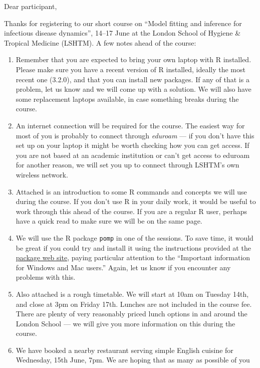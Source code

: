 \documentclass[paper=a4, 11pt]{scrlttr2}
\begin{document}
\begin{letter}{}
\opening{Dear participant,}
Thanks for registering to our short course on ``Model fitting and
inference for infectious disease dynamics'', 14--17 June at the London
School of Hygiene \& Tropical Medicine (LSHTM). A few notes ahead of
the course:

\begin{enumerate}
\item Remember that you are expected to bring your own laptop with R
installed. Please make sure you have a recent version of R installed,
ideally the most recent one (3.2.0), and that you can install new packages. If
any of that is a problem, let us know and we will come up with a solution. We
will also have some replacement laptops available, in case something breaks
during the course. 
\item An internet connection will be required for the course. The easiest
way for most of you is probably to connect through \emph{eduroam} --- if you
don't have this set up on your laptop it might be worth checking how you
can get access. If you are not based at an academic institution or can't
get access to eduroam for another reason, we will set you up to connect
through LSHTM's own wireless network.
\item Attached is an introduction to some R commands and concepts
we will use during the course. If you don't use R in your daily work, it
would be useful to work through this ahead of the course. If you are a
regular R user, perhaps have a quick read to 
make sure we will be on the same page.
\item We will use the R package \texttt{pomp} in one of the
  sessions. To save time, it would be great if you could try and
  install it using the instructions provided at the 
  \href{http://pomp.r-forge.r-project.org/vignettes/getting_started.html#installing-the-package}{package web site},
  paying particular attention to the ``Important information for
  Windows and Mac users.'' Again, let us know if you encounter any
  problems with this.
\item Also attached is a rough timetable. We will start at 10am on Tuesday 14th,
and close at 3pm on Friday 17th. Lunches are not included in the
course fee. There are plenty of very reasonably priced lunch options in
and around the London School --- we will give you more information on
this during the course.
\item We have booked a nearby restaurant serving simple English cuisine for
Wednesday, 15th June, 7pm. We are hoping that as many as possible of you

\end{enumerate}
\end{letter}
\end{document}
